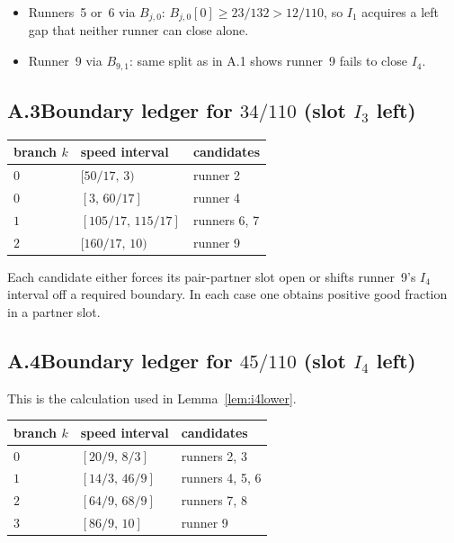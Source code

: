 \documentclass[12pt,a4paper]{amsart}
\theoremstyle{definition}
\theoremstyle{remark}
\begin{document}
\begin{itemize}
  \item Runners~5 or~6 via $B_{j,0}$: $B_{j,0}[0]\ge 23/132>12/110$, so $I_1$ acquires a
        left gap that neither runner can close alone.
  \item Runner~9 via $B_{9,1}$: same split as in A.1 shows runner~9 fails to close $I_4$.
\end{itemize}

\subsection*{A.3\quad Boundary ledger for $34/110$ (slot $I_3$ left)}

\begin{center}
\begin{tabular}{lll}
\toprule
branch $k$ & speed interval & candidates \\
\midrule
$0$ & $[50/17,\,3)$ & runner 2 \\
$0$ & $[3,\,60/17]$ & runner 4 \\
$1$ & $[105/17,\,115/17]$ & runners 6, 7 \\
$2$ & $[160/17,\,10)$ & runner 9 \\
\bottomrule
\end{tabular}
\end{center}

Each candidate either forces its pair-partner slot open or shifts runner~9's $I_4$ interval
off a required boundary. In each case one obtains positive good fraction in a partner slot.

\subsection*{A.4\quad Boundary ledger for $45/110$ (slot $I_4$ left)}

This is the calculation used in Lemma~\ref{lem:i4lower}.

\begin{center}
\begin{tabular}{lll}
\toprule
branch $k$ & speed interval & candidates \\
\midrule
$0$ & $[20/9,\,8/3]$ & runners 2, 3 \\
$1$ & $[14/3,\,46/9]$ & runners 4, 5, 6 \\
$2$ & $[64/9,\,68/9]$ & runners 7, 8 \\
$3$ & $[86/9,\,10]$ & runner 9 \\
\bottomrule
\end{tabular}
\end{center}
\end{document}
